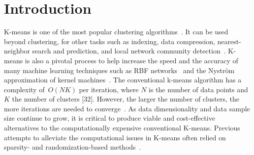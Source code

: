 \section{Introduction}

K-means is one of the most popular clustering algorithms~\cite{hartigan1979algorithm,jain2010data}. It can be used beyond clustering, for other tasks such as indexing, data compression,  nearest-neighbor search and prediction, and local network community detection~\cite{muja2014scalable,van2016local}. K-means is also a pivotal process to help increase the speed and the accuracy of many machine learning techniques such as RBF networks~\cite{que2016back} and the Nyström approximation of kernel machines~\cite{si2016computationally}.
%
The  conventional  k-means  algorithm  has  a  complexity  of~$O(NK)$ per iteration, where $N$ is the number of data points and $K$ the number of clusters [32]. However, the larger the number of clusters, the more iterations are needed to converge~\cite{arthur2006slow}.
%
As data dimensionality and data sample size continue to grow, it is critical to produce viable and cost-effective alternatives to the computationally expensive conventional K-means. Previous attempts to alleviate the computational issues in K-means often relied on sparsity- and randomization-based methods~\cite{boutsidis2014randomized,shen2017compressed,liu2017sparse}.

